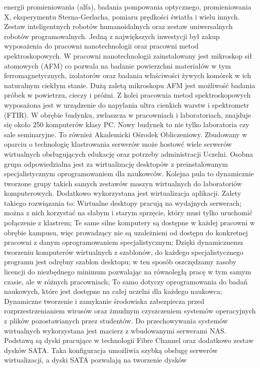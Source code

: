 \documentclass[a4paper,12pt]{article}
\begin{document}
energii promieniowania (alfa), badania pompowania optycznego, promieniowania X, eksperymentu
Sterna-Gerlacha, pomiaru prędkości światła i wielu innych.
Zestaw inteligentnych robotów humanoidalnych oraz zestaw uniwersalnych robotów programowalnych.
Jedną z największych inwestycji był zakup wyposażenia do pracowni nanotechnologii oraz pracowni metod
spektroskopowych. W pracowni nanotechnologii zainstalowany jest mikroskop sił atomowych (AFM) co
pozwala na badanie powierzchni materiałów w tym ferromagnetycznych, izolatorów oraz badania właściwości
żywych komórek w ich naturalnym ciekłym stanie. Dużą zaletą mikroskopu AFM jest możliwość badania
próbek w powietrzu, cieczy i próżni. Z kolei pracownia metod spektroskopowych wyposażona jest w
urządzenie do napylania ultra cienkich warstw i spektrometr (FTIR).
W obrębie budynku, zwłaszcza w pracowniach i laboratoriach, znajduje się około 250 komputerów klasy PC.
Nowy budynek to nie tylko laboratoria czy sale seminaryjne. To również Akademicki Ośrodek Obliczeniowy.
Zbudowany w oparciu o technologię klastrowania serwerów może hostowć wiele serwerów wirtualnych
obsługujących edukację oraz potrzeby administracji Uczelni. Osobna grupa odpowiedzialna jest za
wirtualizację desktopów z preinstalowanym specjalistycznym oprogramowaniem dla naukowców. Kolejna pula
to dynamicznie tworzone grupy takich samych zestawów maszyn wirtualnych do laboratoriów
komputerowych. Dodatkowo wykorzystana jest wirtualizacja aplikacji. Zalety takiego rozwiązania to:
Wirtualne desktopy pracują na wydajnych serwerach; można z nich korzystać na słabym i starym
sprzęcie, który musi tylko uruchomić połączenie z klastrem;
Te same silne komputery są dostępne w każdej pracowni w obrębie kampusu, więc prowadzący nie są
uzależnieni od dostępu do konkretnej pracowni z danym oprogramowaniem specjalistycznym;
Dzięki dynamicznemu tworzeniu komputerów wirtualnych z szablonów, do każdego specjalistycznego
programu jest odrębny szablon desktopu; w ten sposób oszczędzamy zasoby licencji do niezbędnego
minimum pozwalając na równoległą pracę w tym samym czasie, ale w różnych pracowniach;
To samo dotyczy oprogramowania do badań naukowych, które jest dostępne na całej uczelni dla każdego
naukowca;
Dynamiczne tworzenie i zamykanie środowiska zabezpiecza przed rozprzestrzenianiem wirusów oraz
żmudnym czyszczeniem systemów operacyjnych z plików pozostawianych przez studentów.
Do przechowywania systemów wirtualnych wykorzystana jest macierz z wbudowanymi serwerami NAS.
Podstawą są dyski pracujące w technologii Fibre Channel oraz dodatkowo zestaw dysków SATA. Taka
konfiguracja umożliwia szybką obsługę serwerów wirtualizacji, a dyski SATA pozwalają na tworzenie dysków
\end{document}
